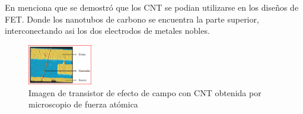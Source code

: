 \documentclass[a4paper]{article} %
\begin{document}
	En \cite{3} menciona que se demostró que los CNT se podian utilizarse en los diseños de FET. Donde los nanotubos de carbono se encuentra la parte superior, interconectando asi los dos electrodos de metales nobles.
	\begin{figure}[H] 
		\centering
		\includegraphics[width=0.25\textwidth]{IMAGENES/3.PNG}
		\caption{Imagen de transistor de efecto de campo con CNT obtenida por microscopio de fuerza atómica  \cite{3}}
		\label{f_3}
	\end{figure}
	
	



	
	






	
	
\end{document}
